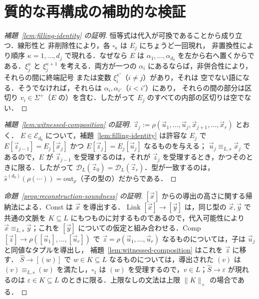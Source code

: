 \documentclass[11pt,a4paper]{ltjsarticle}
\numberwithin{equation}{section}
\theoremstyle{plain}
\theoremstyle{definition}
\theoremstyle{remark}
\newcommand{\D}{\mathcal{D}}
\newcommand{\out}{\mathrm{out}}
\newcommand{\tuple}[1]{\vec{#1}}
\newcommand{\blank}{\square}
\newcommand{\eps}{\varepsilon}
\theoremstyle{plain}
\begin{document}
\section{質的な再構成の補助的な検証}
\label{app:qualitative-construction-details}

\begin{proof}[補題~\ref{lem:filling-identity} の証明]
恒等式は代入が可換であることから成り立つ．線形性と
非削除性により，各 $\blank_\kappa$ は $E_j$ にちょうど一回現れ，
非置換性により順序 $\kappa=1,\ldots,d_j$ で現れる．なぜなら $E$ は
$\alpha_1,\ldots,\alpha_{d_0}$ を左から右へ置くからである．$\xi_j^\kappa$ と
$\xi_j^{\kappa+1}$ を考える．両方が一つの $\alpha_i$ にあるならば，非併合性により，それらの間に終端記号
または変数 $\xi_i^{\kappa'}$（$i\ne j$）があり，それは
空でない語になる．そうでなければ，それらは $\alpha_i,\alpha_{i'}$（$i<i'$）にあり，
それらの間の部分は区切り $v_i\in\Sigma^+$（$E$ の）を含む．したがって
$E_j$ のすべての内部の区切りは空でない．
\end{proof}

\begin{proof}[補題~\ref{lem:witnessed-composition} の証明]
$\tuple z_j:=\rho(\tuple u_1,\ldots,\tuple u_j,\tuple x_{j+1},\ldots,\tuple x_r)$ とおく．
$E\in\mathcal E_{d_0}$ について，補題~\ref{lem:filling-identity} は許容な $E_j$ で
$E[\tuple z_{j-1}]=E_j[\tuple x_j]$ かつ $E[\tuple z_j]=E_j[\tuple u_j]$ なるものを与える；
$\tuple u_j\equiv_{L,s}\tuple x_j$ であるので，$E$ が $\tuple z_{j-1}$ を受理するのは，それが
$\tuple z_j$ を受理するとき，かつそのときに限る．したがって $\D_L(\tuple z_0)=\D_L(\tuple z_r)$．型が一致するのは，
$\widehat s^{(d_0)}(\rho(\cdots))=\out_\rho$（子の型の）だからである．
\end{proof}

\begin{proof}[命題~\ref{prop:reconstruction-soundness} の証明]
$[\tuple x]$ からの導出の高さに関する帰納法による．Const は $\tuple x$ を導出する．
Link $[\tuple x]\to[\tuple y]$ は，同じ型の $\tuple x,\tuple y$ で共通の文脈を
$K\subseteq L$ にもつものに対するものであるので，代入可能性により $\tuple x\equiv_{L,s}\tuple y$；これを
$[\tuple y]$ についての仮定と組み合わせる．Comp
$[\tuple z]\to\rho([\tuple u_1],\ldots,[\tuple u_r])$ で $\tuple z=\rho(\tuple u_1,
\ldots,\tuple u_r)$ なるものについては，子は $\tuple u_j$ と同値なタプルを導出し，
補題~\ref{lem:witnessed-composition} はこれを $\tuple z$ に移す．
$\widehat S\to[(w)]$ で $w\in K\subseteq L$ なるものについては，導出された $(v)$ は
$(v)\equiv_{L,s}(w)$ を満たし，$\blank_1$ は $(w)$ を受理するので，$v\in L$；$\widehat S\to\eps$ が現れるのは
$\eps\in K\subseteq L$ のときに限る．上限なしの文法は上限 $\|K\|_+$ の場合である．
\end{proof}
\end{document}
